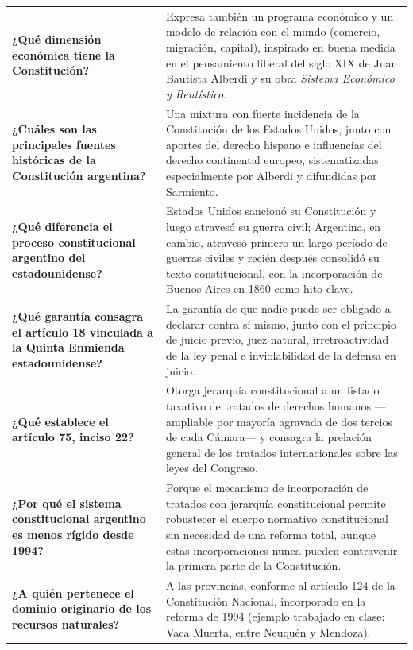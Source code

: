 \documentclass[12pt,oneside]{book}
\begin{document}
\begin{longtable}{
    >{\raggedright\arraybackslash}p{}
    >{\raggedright\arraybackslash}p{}
}
\textbf{¿Qué dimensión económica tiene la Constitución?} &
Expresa también un programa económico y un modelo de relación con el mundo (comercio, migración, capital), inspirado en buena medida en el pensamiento liberal del siglo XIX de Juan Bautista Alberdi y su obra \textit{Sistema Económico y Rentístico}. \\

\textbf{¿Cuáles son las principales fuentes históricas de la Constitución argentina?} &
Una mixtura con fuerte incidencia de la Constitución de los Estados Unidos, junto con aportes del derecho hispano e influencias del derecho continental europeo, sistematizadas especialmente por Alberdi y difundidas por Sarmiento. \\

\textbf{¿Qué diferencia el proceso constitucional argentino del estadounidense?} &
Estados Unidos sancionó su Constitución y luego atravesó su guerra civil; Argentina, en cambio, atravesó primero un largo período de guerras civiles y recién después consolidó su texto constitucional, con la incorporación de Buenos Aires en 1860 como hito clave. \\

\textbf{¿Qué garantía consagra el artículo 18 vinculada a la Quinta Enmienda estadounidense?} &
La garantía de que nadie puede ser obligado a declarar contra sí mismo, junto con el principio de juicio previo, juez natural, irretroactividad de la ley penal e inviolabilidad de la defensa en juicio. \\

\textbf{¿Qué establece el artículo 75, inciso 22?} &
Otorga jerarquía constitucional a un listado taxativo de tratados de derechos humanos ---ampliable por mayoría agravada de dos tercios de cada Cámara--- y consagra la prelación general de los tratados internacionales sobre las leyes del Congreso. \\

\textbf{¿Por qué el sistema constitucional argentino es menos rígido desde 1994?} &
Porque el mecanismo de incorporación de tratados con jerarquía constitucional permite robustecer el cuerpo normativo constitucional sin necesidad de una reforma total, aunque estas incorporaciones nunca pueden contravenir la primera parte de la Constitución. \\

\textbf{¿A quién pertenece el dominio originario de los recursos naturales?} &
A las provincias, conforme al artículo 124 de la Constitución Nacional, incorporado en la reforma de 1994 (ejemplo trabajado en clase: Vaca Muerta, entre Neuquén y Mendoza). \\


\end{longtable}
\end{document}
